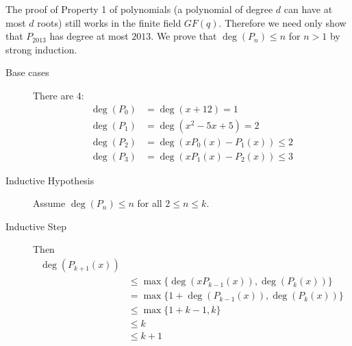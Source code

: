 \begin{enumerate}[label=(\alph*)]
\begin{solution}
The proof of Property 1 of polynomials (a polynomial of degree $d$ can 
have at most $d$ roots) still works in the finite field $GF(q)$. 
Therefore we need only show that $P_{2013}$ has degree at most $2013$. 
We prove that $\operatorname{deg}(P_n) \leq n$ for $n>1$ by strong induction.
\begin{description}
\item[Base cases] There are 4:
\begin{equation}
\begin{split}
\operatorname{deg}(P_0) &= \operatorname{deg}(x+12) = 1 \\ \nonumber
\operatorname{deg}(P_1) &= \operatorname{deg}(x^2 - 5x + 5) = 2 \\
\operatorname{deg}(P_2) &= \operatorname{deg}(xP_0(x) - P_1(x)) \leq 2 \\
\operatorname{deg}(P_3) &= \operatorname{deg}(xP_1(x) - P_2(x)) \leq 3
\end{split}
\end{equation}
\item[Inductive Hypothesis] Assume $\operatorname{deg}(P_n) \leq n$ 
for all $2\leq n \leq k$.
\item[Inductive Step] Then
\begin{equation}
\begin{split}
\operatorname{deg} (P_{k+1}(x)) \\ \nonumber
&\leq \operatorname{max} \{  \operatorname{deg}(xP_{k-1}(x)), 
\operatorname{deg}(P_k(x)) \}  \\
&= \operatorname{max} \{ 1 + \operatorname{deg}(P_{k-1}(x)), 
\operatorname{deg}(P_k(x)) \} \\
&\leq \operatorname{max} \{1+k - 1, k \} \\
& \leq k \\
& \leq k+1
\end{split}
\end{equation}
\end{description}
\end{solution}
\end{enumerate}

\clearpage